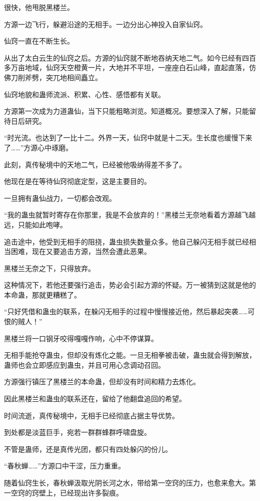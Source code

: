 \begin{this_body}
很快，他甩脱黑楼兰。

方源一边飞行，躲避沿途的无相手。一边分出心神投入自家仙窍。

仙窍一直在不断生长。

从出了太白云生的仙窍之后。方源的仙窍就不断地吞纳天地二气。如今已经有四百多万亩地域，仙窍天空橙黄一片，大地并不平坦，一座座白石山峰，直起直落，仿佛刀削斧劈，突兀地相间矗立。

仙窍地貌和蛊师流派、积累、心性、感悟都有关联。

方源第一次成为力道蛊仙，当下只能粗略浏览。知道概况。要想深入了解，只能留待日后研究。

“时光流。也达到了一比十二。外界一天，仙窍中就是十二天。生长度也缓慢下来了……”方源心中琢磨。

此刻，真传秘境中的天地二气，已经被他吸纳得差不多了。

他现在是在等待仙窍彻底定型，这是主要目的。

一旦拥有蛊仙战力，一切都会改观。

“我的蛊虫就暂时寄存在你那里，我是不会放弃的！”黑楼兰无奈地看着方源越飞越远，只能如此咆哮。

追击途中，他受到无相手的阻挠，蛊虫损失数量众多。他自己躲闪无相手就已经相当困难，现在又要追击方源，当然会遭此恶果。

黑楼兰无奈之下，只得放弃。

这种情况下，若他还要强行追击，势必会引起方源的怀疑。万一被猜到这就是他的本命蛊，那就更糟糕了。

“只好凭借和蛊虫的联系，在躲闪无相手的过程中慢慢接近他，然后暴起突袭……可恨的贼人！”

黑楼兰将一口钢牙咬得嘎嘎作响，心中不停谋算。

无相手能抢夺蛊虫，但却没有炼化之能。一旦无相拳被击破，蛊虫就会得到解放，蛊师也会立即感应到蛊虫，并且可用心念调动召回。

方源强行镇压了黑楼兰的本命蛊，但却没有时间和精力去炼化。

因此黑楼兰和蛊虫的联系还在，留给了他翻盘追回的希望。

时间流逝，真传秘境中，无相手已经彻底占据主导优势。

到处都是淡蓝巨手，宛若一群群蜂群呼啸盘旋。

不管是蛊师，还是真传光团，都只有四处躲闪的份儿。

“春秋蝉……”方源口中干涩，压力重重。

随着仙窍生长，春秋蝉汲取光阴长河之水，带给第一空窍的压力，也愈来愈大。第一空窍的窍壁上，已经现出许多裂痕。


\end{this_body}
